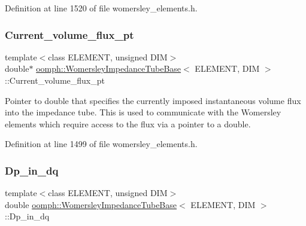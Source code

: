 Definition at line 1520 of file womersley\+\_\+elements.\+h.

\mbox{\label{classoomph_1_1WomersleyImpedanceTubeBase_a7363d921cd306353eae884b9cfe5c8e9}} 
\subsubsection{\texorpdfstring{Current\+\_\+volume\+\_\+flux\+\_\+pt}{Current\_volume\_flux\_pt}}
{\footnotesize\ttfamily template$<$class E\+L\+E\+M\+E\+NT, unsigned D\+IM$>$ \\
double$\ast$ \hyperlink{classoomph_1_1WomersleyImpedanceTubeBase}{oomph\+::\+Womersley\+Impedance\+Tube\+Base}$<$ E\+L\+E\+M\+E\+NT, D\+IM $>$\+::Current\+\_\+volume\+\_\+flux\+\_\+pt\hspace{0.3cm}{\ttfamily [protected]}}



Pointer to double that specifies the currently imposed instantaneous volume flux into the impedance tube. This is used to communicate with the Womersley elements which require access to the flux via a pointer to a double. 



Definition at line 1499 of file womersley\+\_\+elements.\+h.

\mbox{\label{classoomph_1_1WomersleyImpedanceTubeBase_a4f6f0c9043ea66a5b0c3a623cf1e7354}} 
\subsubsection{\texorpdfstring{Dp\+\_\+in\+\_\+dq}{Dp\_in\_dq}}
{\footnotesize\ttfamily template$<$class E\+L\+E\+M\+E\+NT, unsigned D\+IM$>$ \\
double \hyperlink{classoomph_1_1WomersleyImpedanceTubeBase}{oomph\+::\+Womersley\+Impedance\+Tube\+Base}$<$ E\+L\+E\+M\+E\+NT, D\+IM $>$\+::Dp\+\_\+in\+\_\+dq\hspace{0.3cm}{\ttfamily [protected]}}



